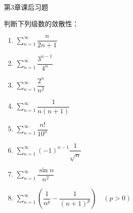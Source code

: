 \documentclass[aspectratio=169,10pt,fontset=fandol]{ctexbeamer}
\begin{document}
\begin{frame}[t,fragile]{第3章课后习题}
\normalsize
{\normalsize


判断下列级数的敛散性：



\begin{enumerate}

\item \(\sum_{n=1}^{\infty} \dfrac{n}{2n+1}\)

\item \(\sum_{n=1}^{\infty} \dfrac{3^{n-1}}{4^n}\)

\item \(\sum_{n=1}^{\infty} \dfrac{2^n}{n^2}\)

\item \(\sum_{n=1}^{\infty} \dfrac{1}{n(n+1)}\)

\item \(\sum_{n=1}^{\infty} \dfrac{n!}{10^n}\)

\item \(\sum_{n=1}^{\infty} (-1)^{n-1} \dfrac{1}{\sqrt{n}}\)

\item \(\sum_{n=1}^{\infty} \dfrac{\sin n}{n^2}\)

\item \(\sum_{n=1}^{\infty} \left(\dfrac{1}{n^p} - \dfrac{1}{(n+1)^p}\right) \quad (p>0)\)

\end{enumerate}


}
\end{frame}
\end{document}
